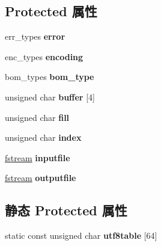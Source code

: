 \subsection*{Protected 属性}
\begin{DoxyCompactItemize}
\item 
\mbox{\label{classutf__converter_ac95a995f4836917eda5dbd8eaea6f420}} 
err\+\_\+types {\bfseries error}
\item 
\mbox{\label{classutf__converter_a0b36f592864abe055d39c973e48e89b9}} 
enc\+\_\+types {\bfseries encoding}
\item 
\mbox{\label{classutf__converter_a1ea5ff7a1a3a79276af28cad31cdb959}} 
bom\+\_\+types {\bfseries bom\+\_\+type}
\item 
\mbox{\label{classutf__converter_af91b86a15c5a7bb25143384408dcb143}} 
unsigned char {\bfseries buffer} \mbox{[}4\mbox{]}
\item 
\mbox{\label{classutf__converter_ac652b5794a769062a68700536ea73728}} 
unsigned char {\bfseries fill}
\item 
\mbox{\label{classutf__converter_a9fe32ca75f04ae948b68cff6af4977a5}} 
unsigned char {\bfseries index}
\item 
\mbox{\label{classutf__converter_a2ca5d2f86ee8ece7ca51b43e4d7e65c4}} 
\hyperlink{classbasic__fstream}{fstream} {\bfseries inputfile}
\item 
\mbox{\label{classutf__converter_aaacec06d519c78a108a5bff3754dacb8}} 
\hyperlink{classbasic__fstream}{fstream} {\bfseries outputfile}
\end{DoxyCompactItemize}
\subsection*{静态 Protected 属性}
\begin{DoxyCompactItemize}
\item 
static const unsigned char {\bfseries utf8table} \mbox{[}64\mbox{]}
\end{DoxyCompactItemize}


